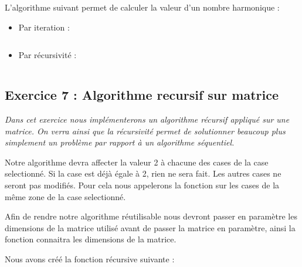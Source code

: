 L'algorithme suivant permet de calculer la valeur d'un nombre harmonique :

\begin{itemize}
\item Par iteration :
\inputminted[linenos,firstline=7, lastline=14]{cpp}{../sources/cpp/TP1-2/harmonique.c}
\item Par récursivité :
\inputminted[linenos,firstline=16, lastline=21]{cpp}{../sources/cpp/TP1-2/harmonique.c}
\end{itemize}

\subsection{Exercice 7 : Algorithme recursif sur matrice}
\textit{Dans cet exercice nous implémenterons un algorithme récursif appliqué sur une matrice. On verra ainsi que la récursivité permet de solutionner beaucoup plus simplement un problème par rapport à un algorithme séquentiel.}

Notre algorithme devra affecter la valeur 2 à chacune des cases de la case selectionné.
Si la case est déjà égale à 2, rien ne sera fait.
Les autres cases ne seront pas modifiés.
Pour cela nous appelerons la fonction sur les cases de la même zone de la case selectionné.

Afin de rendre notre algorithme réutilisable nous devront passer en paramètre les dimensions de la matrice utilisé avant de passer la matrice en paramètre, ainsi la fonction connaitra les dimensions de la matrice.

Nous avons créé la fonction récursive suivante :

\inputminted[linenos,firstline=8, lastline=25]{cpp}{../sources/cpp/TP1-2/bubbleBreaker.c}
